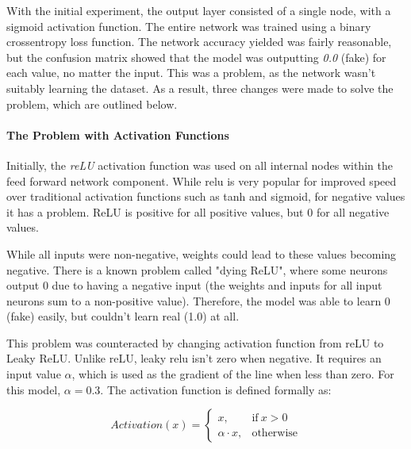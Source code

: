 \documentclass[11pt,a4paper]{article}
\begin{document}
                With the initial experiment, the output layer consisted of a single node, with a sigmoid activation function. The entire network was trained using a binary crossentropy loss function. The network accuracy yielded was fairly reasonable,
                but the confusion matrix showed that the model was outputting \emph{0.0} (fake) for each value, no matter the input. This was a problem, as the network wasn't suitably learning the dataset. As a result, three changes were made to solve the problem, which are outlined below.
                
                \paragraph{The Problem with Activation Functions}
                Initially, the \emph{reLU} activation function was used on all internal nodes within the feed forward network component. While relu is very popular for improved speed over traditional activation functions such as tanh and sigmoid,
                for negative values it has a problem. ReLU is positive for all positive values, but 0 for all negative values.

                While all inputs were non-negative, weights could lead to these values becoming negative. There is a known problem called "dying ReLU", where some neurons output 0
                due to having a negative input (the weights and inputs for all input neurons sum to a non-positive value). Therefore, the model was able to learn 0 (fake) easily, but
                couldn't learn real (1.0) at all. \cite{liu_liu_2017}

                This problem was counteracted by changing activation function from reLU to Leaky ReLU. Unlike reLU, leaky relu isn't zero when negative. It requires an input value $\alpha$, which is used
                as the gradient of the line when less than zero. \cite{liu_liu_2017} For this model, $\alpha=0.3$. The activation function is defined formally as:
                
                \begin{equation}
                    Activation(x) =
                    \begin{cases}
                    x, & \text{if}\ x>0 \\
                    \alpha \cdot x, & \text{otherwise}
                    \end{cases}
                \end{equation}
\end{document}
